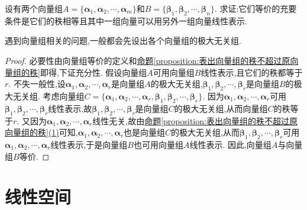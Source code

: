 \documentclass[lang=cn,newtx,10pt,scheme=chinese]{elegantbook}
\begin{document}
\begin{proposition}[向量组等价的充要条件]\label{proposition:向量组等价的充要条件}
设有两个向量组\(A = \{\boldsymbol{\alpha}_1,\boldsymbol{\alpha}_2,\cdots,\boldsymbol{\alpha}_m\}\)和\(B = \{\boldsymbol{\beta}_1,\boldsymbol{\beta}_2,\cdots,\boldsymbol{\beta}_n\}\). 求证:它们等价的充要条件是它们的秩相等且其中一组向量可以用另外一组向量线性表示.
\end{proposition}
\begin{note}
    遇到向量组相关的问题,一般都会先设出各个向量组的极大无关组.
\end{note}
\begin{proof}
必要性由向量组等价的定义和\hyperref[proposition:表出向量组的秩不超过原向量组的秩]{命题\ref{proposition:表出向量组的秩不超过原向量组的秩}}即得,下证充分性. 假设向量组\(A\)可用向量组\(B\)线性表示,且它们的秩都等于\(r\). 不失一般性,设\(\boldsymbol{\alpha}_1,\boldsymbol{\alpha}_2,\cdots,\boldsymbol{\alpha}_r\)是向量组\(A\)的极大无关组,\(\boldsymbol{\beta}_1,\boldsymbol{\beta}_2,\cdots,\boldsymbol{\beta}_r\)是向量组\(B\)的极大无关组. 考虑向量组\(C = \{\boldsymbol{\alpha}_1,\boldsymbol{\alpha}_2,\cdots,\boldsymbol{\alpha}_r,\boldsymbol{\beta}_1,\boldsymbol{\beta}_2,\cdots,\boldsymbol{\beta}_r\}\). 因为\(\boldsymbol{\alpha}_1,\boldsymbol{\alpha}_2,\cdots,\boldsymbol{\alpha}_r\)可用\(\boldsymbol{\beta}_1,\boldsymbol{\beta}_2,\cdots,\boldsymbol{\beta}_r\)线性表示,故\(\boldsymbol{\beta}_1,\boldsymbol{\beta}_2,\cdots,\boldsymbol{\beta}_r\)是向量组\(C\)的极大无关组,从而向量组\(C\)的秩等于\(r\). 又因为\(\boldsymbol{\alpha}_1,\boldsymbol{\alpha}_2,\cdots,\boldsymbol{\alpha}_r\)线性无关,故由\hyperref[proposition:表出向量组的秩不超过原向量组的秩]{命题\ref{proposition:表出向量组的秩不超过原向量组的秩}(1)}可知,\(\boldsymbol{\alpha}_1,\boldsymbol{\alpha}_2,\cdots,\boldsymbol{\alpha}_r\)也是向量组\(C\)的极大无关组,从而\(\boldsymbol{\beta}_1,\boldsymbol{\beta}_2,\cdots,\boldsymbol{\beta}_r\)可用\(\boldsymbol{\alpha}_1,\boldsymbol{\alpha}_2,\cdots,\boldsymbol{\alpha}_r\)线性表示,于是向量组\(B\)也可用向量组\(A\)线性表示. 因此,向量组\(A\)与向量组\(B\)等价. 
\end{proof}

\section{线性空间}
\end{document}
